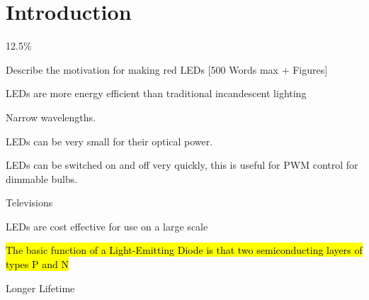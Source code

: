\newpage
\section{Introduction}
\label{sec:intro}

12.5\%

Describe the motivation for making red LEDs [500 Words max + Figures]

LEDs are more energy efficient than traditional incandescent lighting

Narrow wavelengths.

LEDs can be very small for their optical power.

LEDs can be switched on and off very quickly, this is useful for PWM control for dimmable bulbs.

Televisions

LEDs are cost effective for use on a large scale

\hl{The basic function of a Light-Emitting Diode is that two semiconducting layers of types P and N }

Longer Lifetime

\cite{einstein}

%
% 
%
%
%
%
%
%
%
%
%
%
%
%
% 
